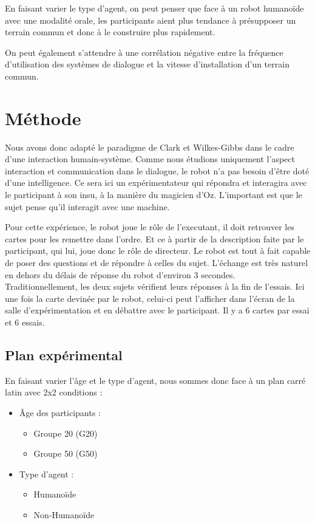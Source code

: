 \documentclass{article}
\begin{document}
En faisant varier le type d'agent, on peut penser que face à un robot humanoïde avec une modalité orale, les participants aient plus tendance à présupposer un terrain commun et donc à le construire plus rapidement.

On peut également s'attendre à une corrélation négative entre la fréquence d'utilisation des systèmes de dialogue et la vitesse d'installation d'un terrain commun.


\section{Méthode}
Nous avons donc adapté le paradigme de Clark et Wilkes-Gibbs dans le cadre d'une interaction humain-système. Comme nous étudions uniquement l'aspect interaction et communication dans le dialogue, le robot n'a pas besoin d'être doté d'une intelligence. Ce sera ici un expérimentateur qui répondra et interagira avec le participant à son insu, à la manière du magicien d'Oz. L'important est que le sujet pense qu'il interagit avec une machine.

Pour cette expérience, le robot joue le rôle de l'executant, il doit retrouver les cartes pour les remettre dans l'ordre. Et ce à partir de la description faite par le participant, qui lui, joue donc le rôle de directeur. Le robot est tout à fait capable de poser des questions et de répondre à celles du sujet. L'échange est très naturel en dehors du délais de réponse du robot d'environ 3 secondes. \\
Traditionnellement, les deux sujets vérifient leurs réponses à la fin de l'essais. Ici une fois la carte devinée par le robot, celui-ci peut l'afficher dans l'écran de la salle d'expérimentation et en débattre avec le participant. Il y a 6 cartes par essai et 6 essais.

\subsection{Plan expérimental}
En faisant varier l'âge et le type d'agent, nous sommes donc face à un plan carré latin avec 2x2 conditions  :
\begin{itemize}
    \item Âge des participants : \begin{itemize}
        \item Groupe 20 (G20)
        \item Groupe 50 (G50)
    \end{itemize}
    \item Type d'agent :\begin{itemize}
        \item Humanoïde
        \item Non-Humanoïde
    \end{itemize}
\end{itemize}
\end{document}

